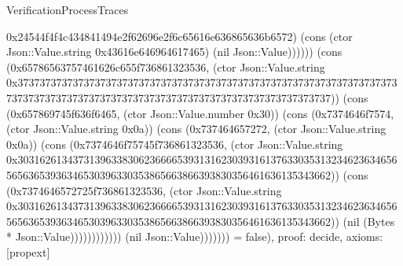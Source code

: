 \begin{lexlean}{VerificationProcessTraces}
\begin{semanticmodule}
{0x24544f4f4c434841494e2f62696e2f6c65616e636865636b6572) (cons (ctor Json::Value.string 0x43616e646964617465) (nil Json::Value)))))) (cons (0x65786563757461626c655f736861323536, (ctor Json::Value.string 0x37373737373737373737373737373737373737373737373737373737373737373737373737373737373737373737373737373737373737373737373737373737)) (cons (0x657869745f636f6465, (ctor Json::Value.number 0x30)) (cons (0x7374646f7574, (ctor Json::Value.string 0x0a)) (cons (0x737464657272, (ctor Json::Value.string 0x0a)) (cons (0x7374646f75745f736861323536, (ctor Json::Value.string 0x30316261343731396338306236666539313162303931613763303531323462363465656563653936346530396330353865663866393830356461636135343662)) (cons (0x7374646572725f736861323536, (ctor Json::Value.string 0x30316261343731396338306236666539313162303931613763303531323462363465656563653936346530396330353865663866393830356461636135343662)) (nil (Bytes * Json::Value)))))))))))) (nil Json::Value))))))) = false),
  proof: decide{},
  axioms: [propext]
}


\end{semanticmodule}
\end{lexlean}
